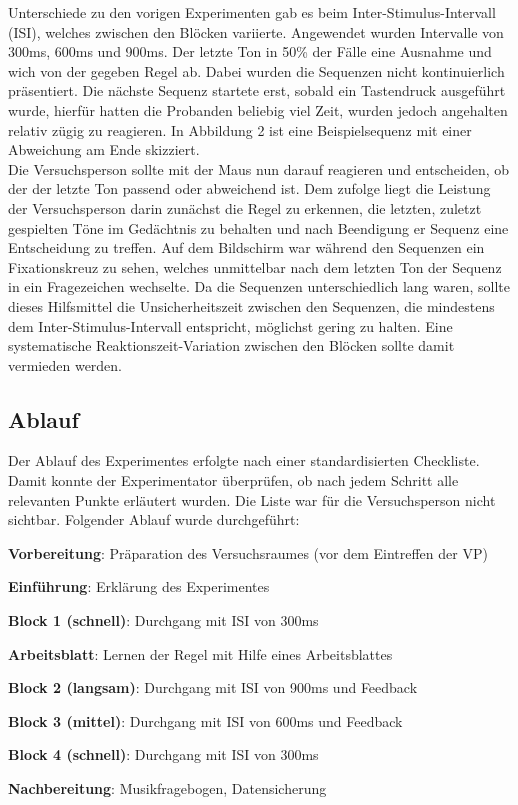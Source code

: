 \documentclass[doc,a4paper,12pt]{apa6}
\begin{document}
Unterschiede zu den vorigen Experimenten gab es beim Inter-Stimulus-Intervall (ISI), welches zwischen den Blöcken variierte. Angewendet wurden Intervalle von 300ms, 600ms und 900ms. Der letzte Ton in 50\% der Fälle eine Ausnahme und wich von der gegeben Regel ab. Dabei wurden die Sequenzen nicht kontinuierlich präsentiert. Die nächste Sequenz startete erst, sobald ein Tastendruck ausgeführt wurde, hierfür hatten die Probanden beliebig viel Zeit, wurden jedoch angehalten relativ zügig zu reagieren. In Abbildung 2 ist eine Beispielsequenz mit einer Abweichung am Ende skizziert.\\
Die Versuchsperson sollte mit der Maus nun darauf reagieren und entscheiden, ob der der letzte Ton passend oder abweichend ist. Dem zufolge liegt die Leistung der Versuchsperson darin zunächst die Regel zu erkennen, die letzten, zuletzt gespielten Töne im Gedächtnis zu behalten und nach Beendigung er Sequenz eine Entscheidung zu treffen. Auf dem Bildschirm war während den Sequenzen ein Fixationskreuz zu sehen, welches unmittelbar nach dem letzten Ton der Sequenz in ein Fragezeichen wechselte. Da die Sequenzen unterschiedlich lang waren, sollte dieses Hilfsmittel die Unsicherheitszeit zwischen den Sequenzen, die mindestens dem Inter-Stimulus-Intervall entspricht, möglichst gering zu halten. Eine systematische Reaktionszeit-Variation zwischen den Blöcken sollte damit vermieden werden.

\subsection{Ablauf}

Der Ablauf des Experimentes erfolgte nach einer standardisierten Checkliste. Damit konnte der Experimentator überprüfen, ob nach jedem Schritt alle relevanten Punkte erläutert wurden. Die Liste war für die Versuchsperson nicht sichtbar. Folgender Ablauf wurde durchgeführt:

\begin{compactenum}
  \item \textbf{Vorbereitung}: Präparation des Versuchsraumes (vor dem Eintreffen der VP)
  \item \textbf{Einführung}: Erklärung des Experimentes
  \item \textbf{Block 1 (schnell)}: Durchgang mit ISI von 300ms
  \item \textbf{Arbeitsblatt}: Lernen der Regel mit Hilfe eines Arbeitsblattes
  \item \textbf{Block 2 (langsam)}: Durchgang mit ISI von 900ms und Feedback
  \item \textbf{Block 3 (mittel)}: Durchgang mit ISI von 600ms und Feedback
  \item \textbf{Block 4 (schnell)}: Durchgang mit ISI von 300ms
  \item \textbf{Nachbereitung}: Musikfragebogen, Datensicherung
\end{compactenum}
\end{document}
